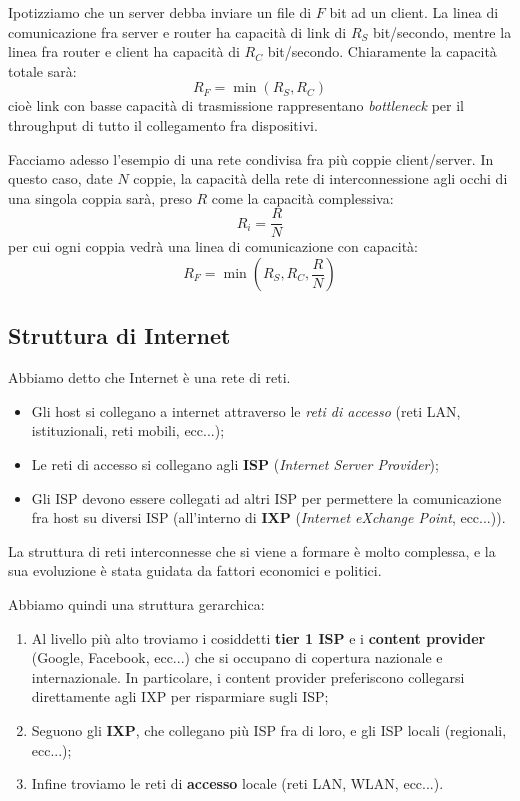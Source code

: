 \documentclass[a4paper,11pt]{article}
\begin{document}
Ipotizziamo che un server debba inviare un file di $F$ bit ad un client.
La linea di comunicazione fra server e router ha capacità di link di $R_S$ bit/secondo, mentre la linea fra router e client ha capacità di $R_C$ bit/secondo.
Chiaramente la capacità totale sarà:
$$
R_F = \min(R_S, R_C)
$$
cioè link con basse capacità di trasmissione rappresentano \textit{bottleneck} per il throughput di tutto il collegamento fra dispositivi.

\par\smallskip

Facciamo adesso l'esempio di una rete condivisa fra più coppie client/server.
In questo caso, date $N$ coppie, la capacità della rete di interconnessione agli occhi di una singola coppia sarà, preso $R$ come la capacità complessiva:
$$
R_i = \frac{R}{N}
$$
per cui ogni coppia vedrà una linea di comunicazione con capacità:
$$
R_F = \min(R_S, R_C, \frac{R}{N})
$$

\subsection{Struttura di Internet}
Abbiamo detto che Internet è una rete di reti.
\begin{itemize}
	\item Gli host si collegano a internet attraverso le \textit{reti di accesso} (reti LAN, istituzionali, reti mobili, ecc...);
	\item Le reti di accesso si collegano agli \textbf{ISP} (\textit{Internet Server Provider});
	\item Gli ISP devono essere collegati ad altri ISP per permettere la comunicazione fra host su diversi ISP (all'interno di \textbf{IXP} (\textit{Internet eXchange Point}, ecc...)).
\end{itemize}

La struttura di reti interconnesse che si viene a formare è molto complessa, e la sua evoluzione è stata guidata da fattori economici e politici.

Abbiamo quindi una struttura gerarchica:
\begin{enumerate}
	\item Al livello più alto troviamo i cosiddetti \textbf{tier 1 ISP} e i \textbf{content provider} (Google, Facebook, ecc...) che si occupano di copertura nazionale e internazionale. In particolare, i content provider preferiscono collegarsi direttamente agli IXP per risparmiare sugli ISP;
	\item Seguono gli \textbf{IXP}, che collegano più ISP fra di loro, e gli ISP locali (regionali, ecc...);
	\item Infine troviamo le reti di 	\textbf{accesso} locale (reti LAN, WLAN, ecc...).
\end{enumerate}
\end{document}
